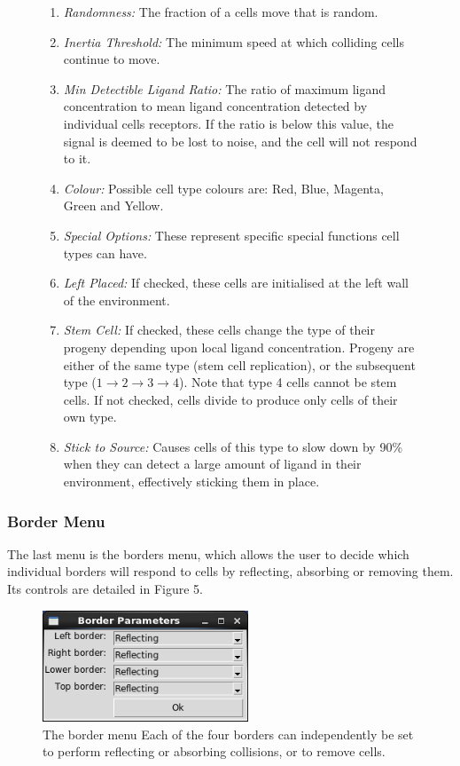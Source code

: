 \documentclass[12pt]{article}
\begin{document}
\begin{figure}[H]
{\begin{enumerate}[topsep=2pt,itemsep=-1ex,partopsep=1ex,parsep=1ex]
derived from its last move.
\item {\itshape Randomness:} The fraction of a cells move that is random.
\item {\itshape Inertia Threshold:} The minimum speed at which colliding cells continue to move.
\item {\itshape Min Detectible Ligand Ratio:} The ratio of maximum ligand 
concentration to mean ligand concentration detected by individual cells 
receptors. If the ratio is below this value, the signal is 
deemed to be lost to noise, and the cell will not respond to it.
\item {\itshape Colour:} Possible cell type colours are: Red, Blue, Magenta, Green and 
Yellow.
\item {\itshape Special Options:} These represent specific special 
functions cell types can have.
\item {\itshape Left Placed:} If checked, these cells are initialised at the left wall of the environment.
\item {\itshape Stem Cell:} If checked, these cells change the type of their progeny depending upon local ligand 
concentration. Progeny are either of the same type (stem cell replication), or the subsequent type  
(\(1 \rightarrow 2 \rightarrow 3 \rightarrow 4\)). Note that type 4 cells cannot be stem cells. If not checked,
cells divide to produce only cells of their own type.
\item {\itshape Stick to Source:} Causes cells of this type to slow down by 90\% when they can detect
  a large amount of ligand in their environment, effectively sticking them in place.
\end{enumerate}
}
\end{figure}

\subsubsection{Border Menu}
The last menu is the borders menu, which allows the user to decide which 
individual borders will respond to cells by reflecting, absorbing or 
removing them. Its controls are detailed in Figure 5.

\begin{figure}[H]
\centering
\includegraphics[width=6.13cm]{media/border_screen.png}
\caption[]{The border menu Each of the four 
borders can independently be set to perform reflecting or absorbing 
collisions, or to remove cells.}
\end{figure}
\end{document}
